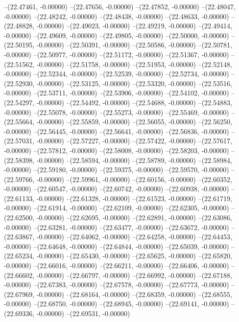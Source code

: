 --(22.47461, -0.00000)
--(22.47656, -0.00000)
--(22.47852, -0.00000)
--(22.48047, -0.00000)
--(22.48242, -0.00000)
--(22.48438, -0.00000)
--(22.48633, -0.00000)
--(22.48828, -0.00000)
--(22.49023, -0.00000)
--(22.49219, -0.00000)
--(22.49414, -0.00000)
--(22.49609, -0.00000)
--(22.49805, -0.00000)
--(22.50000, -0.00000)
--(22.50195, -0.00000)
--(22.50391, -0.00000)
--(22.50586, -0.00000)
--(22.50781, -0.00000)
--(22.50977, -0.00000)
--(22.51172, -0.00000)
--(22.51367, -0.00000)
--(22.51562, -0.00000)
--(22.51758, -0.00000)
--(22.51953, -0.00000)
--(22.52148, -0.00000)
--(22.52344, -0.00000)
--(22.52539, -0.00000)
--(22.52734, -0.00000)
--(22.52930, -0.00000)
--(22.53125, -0.00000)
--(22.53320, -0.00000)
--(22.53516, -0.00000)
--(22.53711, -0.00000)
--(22.53906, -0.00000)
--(22.54102, -0.00000)
--(22.54297, -0.00000)
--(22.54492, -0.00000)
--(22.54688, -0.00000)
--(22.54883, -0.00000)
--(22.55078, -0.00000)
--(22.55273, -0.00000)
--(22.55469, -0.00000)
--(22.55664, -0.00000)
--(22.55859, -0.00000)
--(22.56055, -0.00000)
--(22.56250, -0.00000)
--(22.56445, -0.00000)
--(22.56641, -0.00000)
--(22.56836, -0.00000)
--(22.57031, -0.00000)
--(22.57227, -0.00000)
--(22.57422, -0.00000)
--(22.57617, -0.00000)
--(22.57812, -0.00000)
--(22.58008, -0.00000)
--(22.58203, -0.00000)
--(22.58398, -0.00000)
--(22.58594, -0.00000)
--(22.58789, -0.00000)
--(22.58984, -0.00000)
--(22.59180, -0.00000)
--(22.59375, -0.00000)
--(22.59570, -0.00000)
--(22.59766, -0.00000)
--(22.59961, -0.00000)
--(22.60156, -0.00000)
--(22.60352, -0.00000)
--(22.60547, -0.00000)
--(22.60742, -0.00000)
--(22.60938, -0.00000)
--(22.61133, -0.00000)
--(22.61328, -0.00000)
--(22.61523, -0.00000)
--(22.61719, -0.00000)
--(22.61914, -0.00000)
--(22.62109, -0.00000)
--(22.62305, -0.00000)
--(22.62500, -0.00000)
--(22.62695, -0.00000)
--(22.62891, -0.00000)
--(22.63086, -0.00000)
--(22.63281, -0.00000)
--(22.63477, -0.00000)
--(22.63672, -0.00000)
--(22.63867, -0.00000)
--(22.64062, -0.00000)
--(22.64258, -0.00000)
--(22.64453, -0.00000)
--(22.64648, -0.00000)
--(22.64844, -0.00000)
--(22.65039, -0.00000)
--(22.65234, -0.00000)
--(22.65430, -0.00000)
--(22.65625, -0.00000)
--(22.65820, -0.00000)
--(22.66016, -0.00000)
--(22.66211, -0.00000)
--(22.66406, -0.00000)
--(22.66602, -0.00000)
--(22.66797, -0.00000)
--(22.66992, -0.00000)
--(22.67188, -0.00000)
--(22.67383, -0.00000)
--(22.67578, -0.00000)
--(22.67773, -0.00000)
--(22.67969, -0.00000)
--(22.68164, -0.00000)
--(22.68359, -0.00000)
--(22.68555, -0.00000)
--(22.68750, -0.00000)
--(22.68945, -0.00000)
--(22.69141, -0.00000)
--(22.69336, -0.00000)
--(22.69531, -0.00000)
